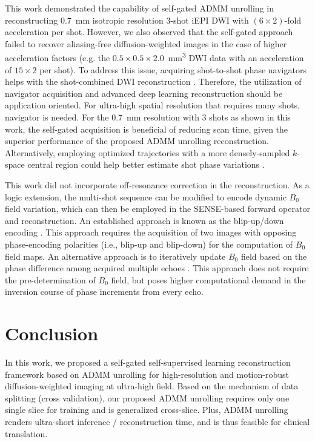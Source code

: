\documentclass[journal,twoside,web]{ieeecolor}
\begin{document}
	This work demonstrated the capability of self-gated ADMM unrolling in
	reconstructing \SI{0.7}{mm} isotropic resolution 3-shot iEPI DWI
	with $(6 \times 2)$-fold acceleration per shot.
	However, we also observed that the self-gated approach
	failed to recover aliasing-free diffusion-weighted images
	in the case of higher acceleration factors
	(e.g. the $0.5\times0.5\times2.0$~\si{mm^3} DWI data
	with an acceleration of $15\times2$ per shot).
	To address this issue, acquiring shot-to-shot phase navigators 
	helps with the shot-combined DWI reconstruction \cite{tan_2024_naviepi}.
	Therefore, the utilization of navigator acquisition and 
	advanced deep learning reconstruction should be application oriented.
	For ultra-high spatial resolution that requires many shots, 
	navigator is needed. 
	For the 0.7~mm resolution with 3 shots as shown in this work,
	the self-gated acquisition is beneficial of reducing scan time, 
	given the superior performance of the proposed ADMM unrolling reconstruction.
	Alternatively, employing optimized trajectories
	with a more densely-sampled $k$-space central region
	could help better estimate shot phase variations
	\cite{liu_2004_diff_spiral,dai_2023_epti-diff}.

	This work did not incorporate off-resonance correction in the reconstruction.
	As a logic extension, the multi-shot sequence can be modified
	to encode dynamic $B_0$ field variation, which can then be employed in the SENSE-based forward operator and reconstruction. An established approach
	is known as the blip-up/down encoding \cite{zahneisen_2017_blipud}.
	This approach requires the acquisition of two images 
	with opposing phase-encoding polarities (i.e., blip-up and blip-down) 
	for the computation of $B_0$ field maps.
	An alternative approach is to iteratively update $B_0$ field 
	based on the phase difference among acquired multiple echoes \cite{tan_2022_meco}.
	This approach does not require the pre-determination of $B_0$ field, 
	but poses higher computational demand in the inversion course of phase increments 
	from every echo.

	\section{Conclusion}

	In this work, we proposed a self-gated self-supervised learning
	reconstruction framework based on ADMM unrolling
	for high-resolution and motion-robust diffusion-weighted imaging 
	at ultra-high field.
	Based on the mechanism of data splitting (cross validation), 
	our proposed ADMM unrolling requires only one single slice for training 
	and is generalized cross-slice. 
	Plus, ADMM unrolling renders ultra-short inference / reconstruction time, 
	and is thus feasible for clinical translation.
\end{document}
